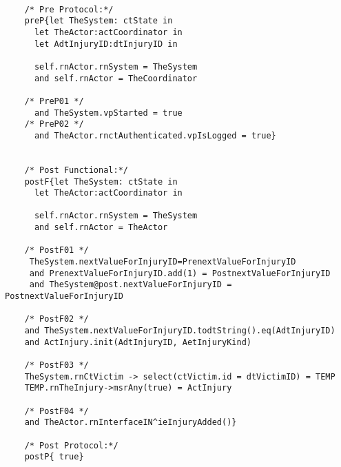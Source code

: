 	\scriptsize
	\vspace{0.5cm}
	\begin{lstlisting}[style=MessirStyle,firstnumber=auto,captionpos=b,caption={\msrmessir (MCL-oriented) specification of the operation \emph{oeAddInjury}.},label=OM-actCoordinator-oeAddInjury-MCL-LST]

	/* Pre Protocol:*/ 
	preP{let TheSystem: ctState in
	  let TheActor:actCoordinator in
	  let AdtInjuryID:dtInjuryID in
	  
	  self.rnActor.rnSystem = TheSystem
	  and self.rnActor = TheCoordinator
	  
	/* PreP01 */
	  and TheSystem.vpStarted = true
	/* PreP02 */
	  and TheActor.rnctAuthenticated.vpIsLogged = true}
	
	
	/* Post Functional:*/ 
	postF{let TheSystem: ctState in
	  let TheActor:actCoordinator in
	  
	  self.rnActor.rnSystem = TheSystem
	  and self.rnActor = TheActor
	  
	/* PostF01 */
	 TheSystem.nextValueForInjuryID=PrenextValueForInjuryID
	 and PrenextValueForInjuryID.add(1) = PostnextValueForInjuryID
	 and TheSystem@post.nextValueForInjuryID = PostnextValueForInjuryID
	
	/* PostF02 */
	and TheSystem.nextValueForInjuryID.todtString().eq(AdtInjuryID)
	and ActInjury.init(AdtInjuryID, AetInjuryKind)
	
	/* PostF03 */
	TheSystem.rnCtVictim -> select(ctVictim.id = dtVictimID) = TEMP
	TEMP.rnTheInjury->msrAny(true) = ActInjury
	
	/* PostF04 */
	and TheActor.rnInterfaceIN^ieInjuryAdded()}
	
	/* Post Protocol:*/ 
	postP{ true}
	
	\end{lstlisting}
	\normalsize 
	
	
	
	





